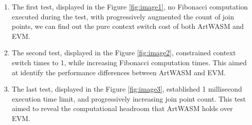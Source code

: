 \begin{enumerate}
  \item The first test, displayed in the Figure \ref{fig:image1}, no Fibonacci computation executed during the test, with progressively augmented the count of join points, we can find out the pure context switch cost of both ArtWASM and EVM.
  \item The second test, displayed in the Figure \ref{fig:image2}, constrained context switch times to 1, while increasing Fibonacci computation times. This aimed at identify the performance differences between ArtWASM and EVM.
  \item The last test, displayed in the Figure \ref{fig:image3}, established 1 millisecond execution time limit, and progressively increasing join point count. This test aimed to reveal the computational headroom that ArtWASM holds over EVM.
\end{enumerate}

